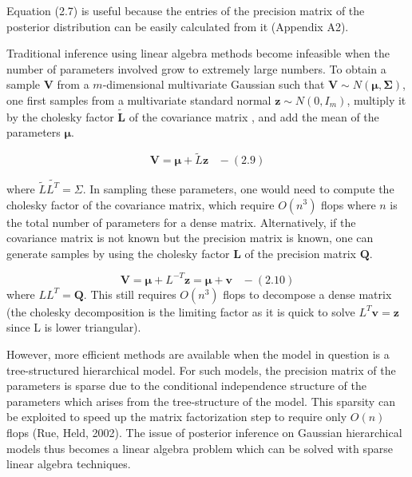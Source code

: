 \documentclass[]{article}
\begin{document}
Equation (2.7) is useful because the entries of the precision matrix of
the posterior distribution can be easily calculated from it (Appendix
A2).

Traditional inference using linear algebra methods become infeasible
when the number of parameters involved grow to extremely large numbers.
To obtain a sample \(\boldsymbol{V}\) from a \(m\)-dimensional
multivariate Gaussian such that
\(\boldsymbol{V} \sim N(\boldsymbol{\mu},\boldsymbol{\Sigma})\), one
first samples from a multivariate standard normal
\(\boldsymbol{z} \sim N(0,I_m)\), multiply it by the cholesky factor
\(\boldsymbol{\tilde{L}}\) of the covariance matrix , and add the mean
of the parameters \(\boldsymbol{\mu}\).

\[\boldsymbol{V} = \boldsymbol{\mu} + \tilde{L} \boldsymbol{z} \;\;\; - (2.9)\]

where \(\tilde{L}\tilde{L^T} = \Sigma\). In sampling these parameters,
one would need to compute the cholesky factor of the covariance matrix,
which require \(O(n^3)\) flops where \(n\) is the total number of
parameters for a dense matrix. Alternatively, if the covariance matrix
is not known but the precision matrix is known, one can generate samples
by using the cholesky factor \(\boldsymbol{L}\) of the precision matrix
\(\boldsymbol{Q}\).

\[\boldsymbol{V} = \boldsymbol{\mu} + L^{-T} \boldsymbol{z} = \boldsymbol{\mu} + \boldsymbol{v} \;\;\; - (2.10)\]
where \(LL^T = \boldsymbol{Q}\). This still requires \(O(n^3)\) flops to
decompose a dense matrix (the cholesky decomposition is the limiting
factor as it is quick to solve \(L^T \boldsymbol{v} = \boldsymbol{z}\)
since L is lower triangular).

However, more efficient methods are available when the model in question
is a tree-structured hierarchical model. For such models, the precision
matrix of the parameters is sparse due to the conditional independence
structure of the parameters which arises from the tree-structure of the
model. This sparsity can be exploited to speed up the matrix
factorization step to require only \(O(n)\) flops (Rue, Held, 2002). The
issue of posterior inference on Gaussian hierarchical models thus
becomes a linear algebra problem which can be solved with sparse linear
algebra techniques. \newline \newline \newline

 \newline 
\end{document}
